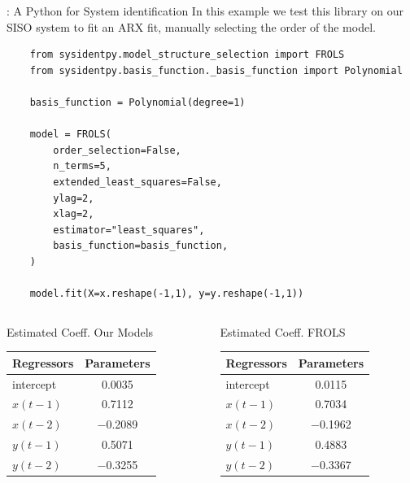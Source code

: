\documentclass[aspectratio=169,hyperref={pdfpagelabels=false}]{beamer}
\begin{document}
\begin{frame}[fragile]{: A Python for System identification}
  In this example we test this library on our SISO system to fit an ARX fit, manually selecting the order of the model.
  
  \begin{verbatim}
    from sysidentpy.model_structure_selection import FROLS
    from sysidentpy.basis_function._basis_function import Polynomial

    basis_function = Polynomial(degree=1)

    model = FROLS(
        order_selection=False,
        n_terms=5,
        extended_least_squares=False,
        ylag=2,
        xlag=2,
        estimator="least_squares",
        basis_function=basis_function,
    )

    model.fit(X=x.reshape(-1,1), y=y.reshape(-1,1))
  \end{verbatim}
\end{frame}

\begin{frame}
  \begin{columns}
    \begin{column}{0.5\textwidth}
      Estimated Coeff. Our Models \centering
      \begin{table}
        \centering
      \begin{tabular}{|l|c|}
          \toprule
          \textbf{Regressors} & \textbf{Parameters} \\
          \midrule
          intercept        & \num{0.0035} \\
          $x(t-1)$ & \num{0.7112} \\
          $x(t-2)$ & \num{-0.2089} \\
          $y(t-1)$ & \num{0.5071} \\
          $y(t-2)$ & \num{-0.3255} \\
          \bottomrule
        \end{tabular}
      \end{table}
    \end{column}

    \begin{column}{0.5\textwidth}
      Estimated Coeff. FROLS \centering
      \begin{table}
        \centering
      \begin{tabular}{|l|c|}
          \toprule
          \textbf{Regressors} & \textbf{Parameters} \\
          \midrule
          intercept        & \num{0.0115} \\
          $x(t-1)$ & \num{0.7034} \\
          $x(t-2)$ & \num{-0.1962} \\
          $y(t-1)$ & \num{0.4883} \\
          $y(t-2)$ & \num{-0.3367} \\
          \bottomrule
        \end{tabular}
      \end{table}
    \end{column}
  \end{columns}
\end{frame}
\end{document}
